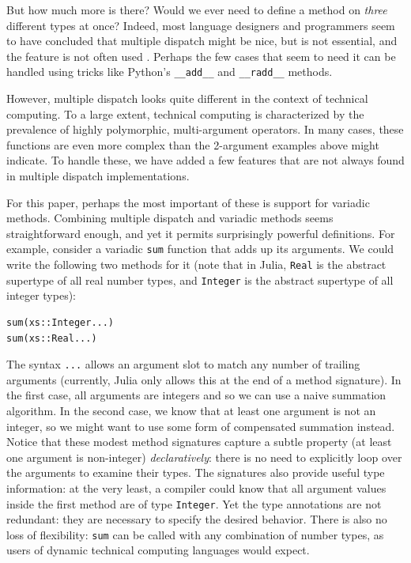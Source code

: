 \documentclass[preprint]{sigplanconf}
\newcommand{\code}[1]{\texttt{#1}}
\begin{document}
But how much more is there? Would we ever need to define a method on
\emph{three} different types at once? Indeed, most language designers and
programmers seem to have concluded that multiple dispatch might be nice, but is
not essential, and the feature is not often used \cite{Muschevici:2008}.
Perhaps the few cases that seem to need it can be handled using tricks like
Python's \code{\_\_add\_\_} and \code{\_\_radd\_\_} methods.

However, multiple dispatch looks quite different in the context of technical
computing. To a large extent, technical computing is characterized
by the prevalence of highly polymorphic, multi-argument operators. In many
cases, these functions are even more complex than the 2-argument
examples above might indicate. To handle these, we have added a few
features that are not always found in multiple dispatch implementations.

For this paper, perhaps the most important of these is support for
variadic methods. Combining multiple dispatch and variadic methods
seems straightforward
enough, and yet it permits surprisingly powerful definitions. For example,
consider a variadic \code{sum} function that adds up its arguments. We could
write the following two methods for it (note that in Julia, \code{Real} is
the abstract supertype of all real number types, and \code{Integer} is the
abstract supertype of all integer types):

\begin{verbatim}
sum(xs::Integer...)
sum(xs::Real...)
\end{verbatim}

The syntax \code{...} allows an argument slot to match any number of trailing
arguments (currently, Julia only allows this at the end of a method signature).
In the first case, all arguments are integers and so we can use a naive
summation algorithm. In the second case, we know that at least one argument
is not an integer, so we might want to use some form of compensated
summation instead. Notice that these modest method signatures
capture a subtle property (at least one argument is non-integer)
\emph{declaratively}: there is no need to explicitly loop over the arguments
to examine their types. The signatures also provide useful type information:
at the very least, a compiler could know that all argument values inside
the first method are of type \code{Integer}. Yet the type annotations
are not redundant: they are necessary to specify the desired behavior. There
is also no loss of flexibility: \code{sum} can be called with any combination
of number types, as users of dynamic technical computing languages would expect.
\end{document}
